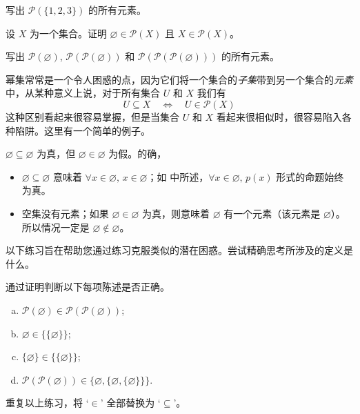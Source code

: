 \begin{exercise}
写出 $\mathcal{P}(\{1, 2, 3\})$ 的所有元素。
\end{exercise}

\begin{exercise}
设 $X$ 为一个集合。证明 $\varnothing \in \mathcal{P}(X)$ 且 $X \in \mathcal{P}(X)$。
\end{exercise}

\begin{exercise}
写出 $\mathcal{P}(\varnothing)$, $\mathcal{P}(\mathcal{P}(\varnothing))$ 和 $\mathcal{P}(\mathcal{P}(\mathcal{P}(\varnothing)))$ 的所有元素。
\end{exercise}

幂集常常是一个令人困惑的点，因为它们将一个集合的\textit{子集}带到另一个集合的\textit{元素}中，从某种意义上说，对于所有集合 $U$ 和 $X$ 我们有
\[ U \subseteq X \quad \Leftrightarrow \quad U \in \mathcal{P}(X) \]
这种区别看起来很容易掌握，但是当集合 $U$ 和 $X$ 看起来很相似时，很容易陷入各种陷阱。这里有一个简单的例子。

\begin{example}
$\varnothing \subseteq \varnothing$ 为真，但 $\varnothing \in \varnothing$ 为假。的确，
\begin{itemize}
\item $\varnothing \subseteq \varnothing$ 意味着 $\forall x \in \varnothing,\, x \in \varnothing$；如  中所述，$\forall x \in \varnothing,\, p(x)$ 形式的命题始终为真。
\item 空集没有元素；如果 $\varnothing \in \varnothing$ 为真，则意味着 $\varnothing$ 有一个元素（该元素是 $\varnothing$）。所以情况一定是 $\varnothing \not \in \varnothing$。
\end{itemize}
\end{example}

以下练习旨在帮助您通过练习克服类似的潜在困惑。尝试精确思考所涉及的定义是什么。

\begin{exercise}
通过证明判断以下每项陈述是否正确。
\begin{enumerate}[(a)]
\item $\mathcal{P}(\varnothing) \in \mathcal{P}(\mathcal{P}(\varnothing))$;
\item $\varnothing \in \{ \{ \varnothing \} \}$;
\item $\{ \varnothing \} \in \{ \{ \varnothing \} \}$;
\item $\mathcal{P}(\mathcal{P}(\varnothing)) \in \{ \varnothing, \{ \varnothing, \{ \varnothing \} \} \}$.
\end{enumerate}
重复以上练习，将 `$\in$' 全部替换为 `$\subseteq$'。
\end{exercise}

